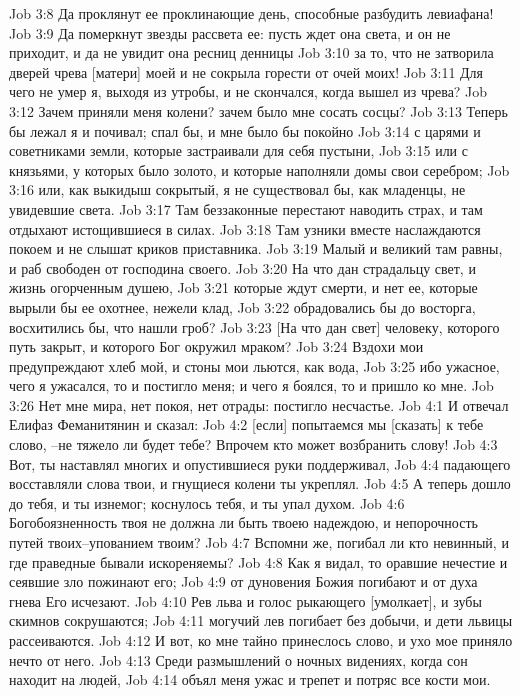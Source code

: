 Job 3:8  Да проклянут ее проклинающие день, способные разбудить левиафана!
Job 3:9  Да померкнут звезды рассвета ее: пусть ждет она света, и он не приходит, и да не увидит она ресниц денницы
Job 3:10  за то, что не затворила дверей чрева [матери] моей и не сокрыла горести от очей моих!
Job 3:11  Для чего не умер я, выходя из утробы, и не скончался, когда вышел из чрева?
Job 3:12  Зачем приняли меня колени? зачем было мне сосать сосцы?
Job 3:13  Теперь бы лежал я и почивал; спал бы, и мне было бы покойно
Job 3:14  с царями и советниками земли, которые застраивали для себя пустыни,
Job 3:15  или с князьями, у которых было золото, и которые наполняли домы свои серебром;
Job 3:16  или, как выкидыш сокрытый, я не существовал бы, как младенцы, не увидевшие света.
Job 3:17  Там беззаконные перестают наводить страх, и там отдыхают истощившиеся в силах.
Job 3:18  Там узники вместе наслаждаются покоем и не слышат криков приставника.
Job 3:19  Малый и великий там равны, и раб свободен от господина своего.
Job 3:20  На что дан страдальцу свет, и жизнь огорченным душею,
Job 3:21  которые ждут смерти, и нет ее, которые вырыли бы ее охотнее, нежели клад,
Job 3:22  обрадовались бы до восторга, восхитились бы, что нашли гроб?
Job 3:23  [На что дан свет] человеку, которого путь закрыт, и которого Бог окружил мраком?
Job 3:24  Вздохи мои предупреждают хлеб мой, и стоны мои льются, как вода,
Job 3:25  ибо ужасное, чего я ужасался, то и постигло меня; и чего я боялся, то и пришло ко мне.
Job 3:26  Нет мне мира, нет покоя, нет отрады: постигло несчастье.
Job 4:1  И отвечал Елифаз Феманитянин и сказал:
Job 4:2  [если] попытаемся мы [сказать] к тебе слово, --не тяжело ли будет тебе? Впрочем кто может возбранить слову!
Job 4:3  Вот, ты наставлял многих и опустившиеся руки поддерживал,
Job 4:4  падающего восставляли слова твои, и гнущиеся колени ты укреплял.
Job 4:5  А теперь дошло до тебя, и ты изнемог; коснулось тебя, и ты упал духом.
Job 4:6  Богобоязненность твоя не должна ли быть твоею надеждою, и непорочность путей твоих--упованием твоим?
Job 4:7  Вспомни же, погибал ли кто невинный, и где праведные бывали искореняемы?
Job 4:8  Как я видал, то оравшие нечестие и сеявшие зло пожинают его;
Job 4:9  от дуновения Божия погибают и от духа гнева Его исчезают.
Job 4:10  Рев льва и голос рыкающего [умолкает], и зубы скимнов сокрушаются;
Job 4:11  могучий лев погибает без добычи, и дети львицы рассеиваются.
Job 4:12  И вот, ко мне тайно принеслось слово, и ухо мое приняло нечто от него.
Job 4:13  Среди размышлений о ночных видениях, когда сон находит на людей,
Job 4:14  объял меня ужас и трепет и потряс все кости мои.
